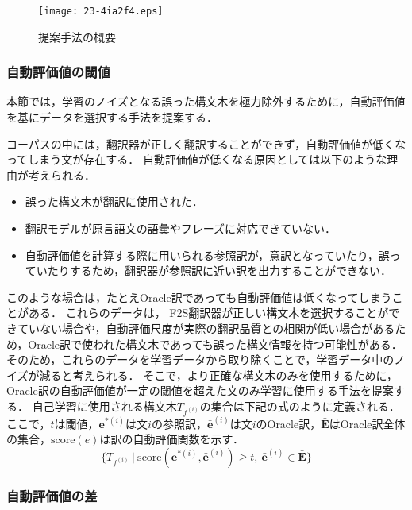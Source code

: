 \documentclass[japanese]{jnlp_1.4}
\begin{document}
\begin{figure}[t]
\begin{center}
\texttt{[image: 23-4ia2f4.eps]}
\end{center}
\caption{提案手法の概要}
\label{fig:proposed_method}
\end{figure}


\subsubsection{自動評価値の閾値}
\label{sec:bleu_threshold}

本節では，学習のノイズとなる誤った構文木を極力除外するために，自動評価値を基にデータを選択する手法を提案する．

コーパスの中には，翻訳器が正しく翻訳することができず，自動評価値が低くなってしまう文が存在する．
自動評価値が低くなる原因としては以下のような理由が考えられる．
\begin{itemize}
\item 誤った構文木が翻訳に使用された．
\item 翻訳モデルが原言語文の語彙やフレーズに対応できていない．
\item 自動評価値を計算する際に用いられる参照訳が，意訳となっていたり，誤っていたりするため，翻訳器が参照訳に近い訳を出力することができない．
\end{itemize}

このような場合は，たとえOracle訳であっても自動評価値は低くなってしまうことがある．
これらのデータは，
F2S翻訳器が正しい構文木を選択することができていない場合や，自動評価尺度が実際の翻訳品質との相関が低い場合があるため，Oracle訳で使われた構文木であっても誤った構文情報を持つ可能性がある．
そのため，これらのデータを学習データから取り除くことで，学習データ中のノイズが減ると考えられる．
そこで，より正確な構文木のみを使用するために，Oracle訳の自動評価値が一定の閾値を超えた文のみ学習に使用する手法を提案する．
自己学習に使用される構文木$T_{f^{(i)}}$の集合は下記の式のように定義される．
ここで，$t$は閾値，$\bm{e}^{*(i)}$は文$i$の参照訳，$\bar{\bm{e}}^{(i)}$は文$i$のOracle訳，$\bar{\bm{E}}$はOracle訳全体の集合，$\text{score}(e)$は訳の自動評価関数を示す．
\begin{equation}
\label{eq:oracle}
\{T_{f^{(i)}}\ |\ \text{score}(\bm{e}^{*(i)}, \bar{\bm{e}}^{(i)}) \ge t,\ \bar{\bm{e}}^{(i)} \in \bar{\bm{E}}\}
\end{equation}


\subsubsection{自動評価値の差}
\label{sec:bleu_diff}
\end{document}
